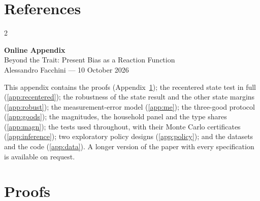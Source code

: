 \documentclass[11pt,a4paper]{article}
\theoremstyle{plain}
\theoremstyle{definition}
\begin{document}
\clearpage

\section*{References}

{\footnotesize
\setlength{\bibsep}{1.5pt}
\renewcommand{\bibsection}{}
\begin{multicols}{2}

\end{multicols}
}

\clearpage
\appendix
\renewcommand{\thesection}{\Alph{section}}
\renewcommand{\thetable}{\Alph{section}.\arabic{table}}
\renewcommand{\thefigure}{\Alph{section}.\arabic{figure}}
\begin{center}
{\Large\textbf{Online Appendix}}\\[4pt]
{\large Beyond the Trait: Present Bias as a Reaction Function}\\[2pt]
Alessandro Facchini --- 10 October 2026
\end{center}
\medskip
\noindent This appendix contains the proofs (Appendix~\ref{app:proofs}); the recentered state test in full
(\ref{app:recentered}); the robustness of the state result and the other state margins (\ref{app:robust}); the
measurement-error model (\ref{app:me}); the three-good protocol (\ref{app:goods}); the magnitudes, the household
panel and the type shares (\ref{app:magn}); the tests used throughout, with their Monte Carlo certificates
(\ref{app:inference}); two exploratory policy designs (\ref{app:policy}); and the datasets and the code
(\ref{app:data}). A longer version of the paper with every specification is available on request.

\section{Proofs}
\label{app:proofs}
\end{document}
